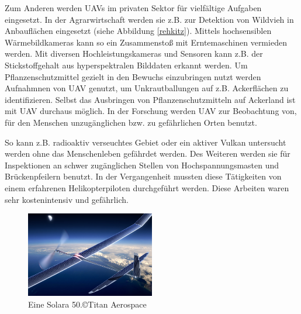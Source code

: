 Zum Anderen werden \acp{UAV} im privaten Sektor für vielfältige Aufgaben eingesetzt. In der Agrarwirtschaft werden sie z.B. zur Detektion von Wildvieh in Anbauflächen eingesetzt (siehe Abbildung \ref{rehkitz}). 
Mittels hochsensiblen Wärmebildkameras kann so ein Zusammenstoß mit Erntemaschinen vermieden werden. Mit diversen Hochleistungskameras und Sensoren kann z.B. der Stickstoffgehalt aus hyperspektralen Bilddaten erkannt werden\cite{workshop_agrar}. Um Pflanzenschutzmittel gezielt in den Bewuchs einzubringen nutzt werden Aufnahmnen von \ac{UAV} genutzt, um Unkrautballungen auf z.B. Ackerflächen zu identifizieren\cite{unkraut}. Selbst das Ausbringen von Pflanzenschutzmitteln auf Ackerland ist mit \ac{UAV} durchaus möglich\cite{holzapfel}.\parfillskip=0pt
 In der Forschung werden \ac{UAV} zur Beobachtung von, für den Menschen unzugänglichen bzw. zu gefährlichen Orten benutzt.\par So kann z.B. radioaktiv verseuchtes Gebiet oder ein aktiver Vulkan untersucht werden ohne das Menschenleben gefährdet werden. Des Weiteren werden sie für Inspektionen an schwer zugänglichen Stellen von Hochspannungsmasten und Brückenpfeilern benutzt. In der Vergangenheit mussten diese Tätigkeiten von einem erfahrenen Helikopterpiloten durchgeführt werden. Diese Arbeiten waren sehr kostenintensiv und gefährlich.


\begin{figure}
  \begin{center}
    \includegraphics[width=0.5\textwidth]{img/solara50.jpg}
  \end{center}
  \caption{Eine Solara 50.©Titan Aerospace}
  \label{solara}
\end{figure}

